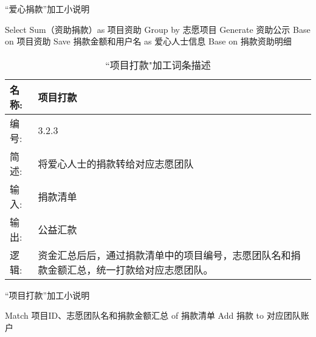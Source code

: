 \begin{algorithm}[H]
    \renewcommand{\thealgorithm}{}
    \caption{“爱心捐款”加工小说明} 
    \label{alg3} 
    \begin{algorithmic}[1] 
        \STATE Select Sum（资助捐款）as 项目资助 Group by 志愿项目
        \STATE Generate 资助公示 Base on 项目资助
        \STATE Save 捐款金额和用户名 as 爱心人士信息 Base on 捐款资助明细
    \end{algorithmic} 
\end{algorithm}
    
    \begin{table}[H]  
    \caption{``项目打款"加工词条描述}  
    \begin{center}  
        \begin{tabular}{l p{11cm}} 
            \hline
            \quad 名称:  &   项目打款 \\
            \hline
            \quad 编号:  & 3.2.3 \\
            \hline
            \quad 简述:  & 将爱心人士的捐款转给对应志愿团队 \\
            \hline
            \quad 输入:  & 捐款清单 \\
            \hline
            \quad 输出:  & 公益汇款 \\
            \hline
            \quad 逻辑:  & 资金汇总后后，通过捐款清单中的项目编号，志愿团队名和捐款金额汇总，统一打款给对应志愿团队。 \\
            \hline
        \end{tabular}
        \label{tab1}
    \end{center}
    \end{table}
    
\begin{algorithm}[H]
    \renewcommand{\thealgorithm}{}
    \caption{“项目打款”加工小说明} 
    \label{alg3} 
    \begin{algorithmic}[1] 
        \STATE Match 项目ID、志愿团队名和捐款金额汇总 of 捐款清单
        \STATE Add 捐款 to 对应团队账户
    \end{algorithmic} 
\end{algorithm}